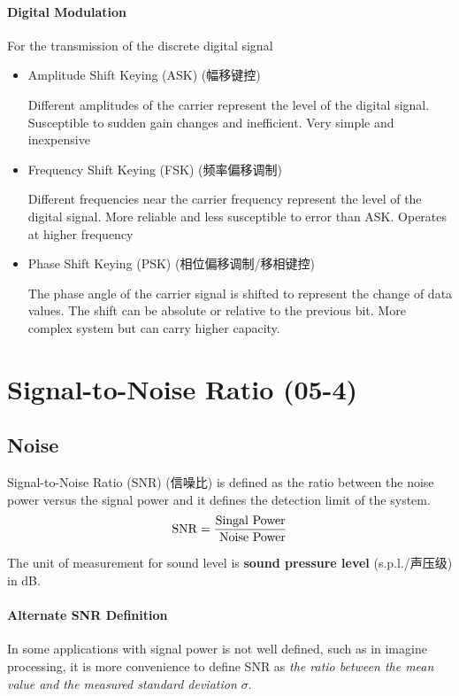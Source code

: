 \documentclass[a4paper,UTF8]{article}
\theoremstyle{mystyle}{
  \newtheorem{law}{Law}
}
\begin{document}
 \paragraph{Digital Modulation}
 For the transmission of the discrete digital signal
\begin{itemize}
\item Amplitude Shift Keying (ASK) (幅移键控)

Different amplitudes of the carrier represent the level of the
digital signal.
 Susceptible to sudden gain changes and inefficient.
 Very simple and inexpensive

\item Frequency Shift Keying (FSK) (频率偏移调制)

Different frequencies near the carrier frequency represent the
level of the digital signal.
 More reliable and less susceptible to error than ASK.
 Operates at higher frequency
\item Phase Shift Keying (PSK) (相位偏移调制/移相键控)

The phase angle of the carrier signal is shifted to represent
the change of data values.
 The shift can be absolute or relative to the previous bit.
 More complex system but can carry higher capacity.
\end{itemize}


\section{Signal-to-Noise Ratio (05-4)}

\subsection{Noise}
Signal-to-Noise Ratio (SNR) (信噪比) is defined as the ratio between
the noise power versus the signal power and it defines the
detection limit of the system.
\[
{\rm SNR} = \frac{\textrm{Singal Power}}{\text{ Noise Power}}
\]

The unit of measurement for sound level is \textbf{sound pressure level} (s.p.l./声压级) in dB.
\paragraph{Alternate SNR Definition}
In some applications with signal power is not well defined,
such as in imagine processing, it is more convenience to
define SNR as \emph{the ratio between the mean value and the
measured standard deviation $\sigma$}.
\end{document}
